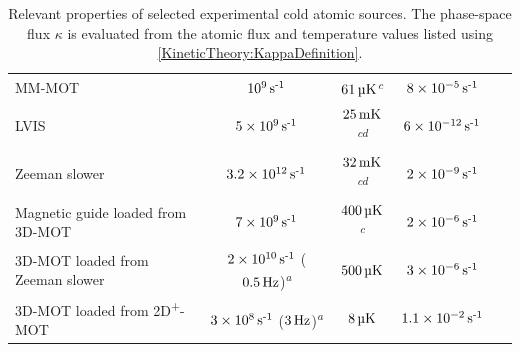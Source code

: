 \begin{table}
\begin{minipage}{\textwidth}
\begin{tabular}{ p{3.8cm} c c c r}
        MM-MOT & $\unit[10^9]{s\textsuperscript{-1}}$ & $\unit[61]{\micro K}$\textsuperscript{\emph{c}} & $\unit[8 \times 10^{-5}]{s\textsuperscript{-1}}$ &~\citep{Cren:2002rt}\\
        LVIS & $\unit[5\times 10^{9}]{s\textsuperscript{-1}}$ & $\unit[25]{mK}$\textsuperscript{\emph{cd}} & $\unit[6 \times 10^{-12}]{s\textsuperscript{-1}}$ &~\citep{Lu:1996} \\
        Zeeman slower & $\unit[3.2\times 10^{12}]{s\textsuperscript{-1}}$ & $\unit[32]{mK}$\textsuperscript{\emph{cd}} & $\unit[2\times10^{-9}]{s\textsuperscript{-1}}$ &~\citep{Slowe:2005} \\
        Magnetic guide loaded from 3D-MOT & $\unit[7\times 10^{9}]{s\textsuperscript{-1}}$ & $\unit[400]{\micro K}$\textsuperscript{\emph{c}} & $\unit[2\times 10^{-6}]{s\textsuperscript{-1}}$ &~\citep{Lahaye:2004}\\
        3D-MOT loaded from Zeeman slower & $\unit[2\times 10^{10}]{s\textsuperscript{-1}}$ ($\unit[0.5]{Hz}$)\textsuperscript{\emph{a}} & $\unit[500]{\micro K}$ & $\unit[3\times 10^{-6}]{s\textsuperscript{-1}}$ &~\citep{Streed:2006}\\
        3D-MOT loaded from 2D\textsuperscript{+}-MOT & $\unit[3\times 10^8]{s\textsuperscript{-1}}$ ($\unit[3]{Hz}$)\textsuperscript{\emph{a}} & $\unit[8]{\micro K}$ & $\unit[1.1\times 10^{-2}]{s\textsuperscript{-1}}$ &~\citep{Muller:2007}\\
        \bottomrule
        \end{tabular}
    \end{minipage}
    \caption{Relevant properties of selected experimental cold atomic sources. The phase-space flux $\kappa$ is evaluated from the atomic flux and temperature values listed using \eqref{KineticTheory:KappaDefinition}.}
    \label{KineticTheory:ExperimentalSources}
\end{table}

